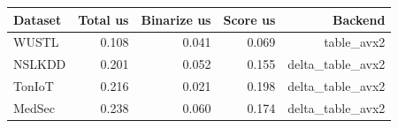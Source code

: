 \begin{tabular}{lrrrr}
\toprule
Dataset & Total us & Binarize us & Score us & Backend \\
\midrule
WUSTL & 0.108 & 0.041 & 0.069 & table\_avx2 \\
NSLKDD & 0.201 & 0.052 & 0.155 & delta\_table\_avx2 \\
TonIoT & 0.216 & 0.021 & 0.198 & delta\_table\_avx2 \\
MedSec & 0.238 & 0.060 & 0.174 & delta\_table\_avx2 \\
\bottomrule
\end{tabular}
